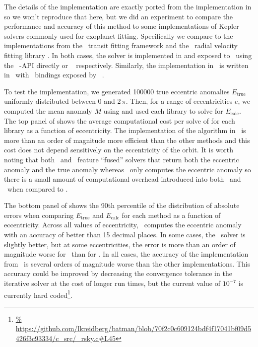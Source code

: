 \documentclass[modern]{aastex62}
\begin{document}
The details of the implementation are exactly ported from the implementation
in \citet{Nijenhuis:1991} so we won't reproduce that here, but we did an
experiment to compare the performance and accuracy of this method to some
implementations of Kepler solvers commonly used for exoplanet fitting.
Specifically we compare to the implementations from the \batman\ transit
fitting framework \citep{Kreidberg:2015} and the \radvel\ radial velocity
fitting library \citep{Fulton:2017, Fulton:2018}.
In both cases, the solver is implemented in  and exposed to
\python\ using the \python\ -API directly or \cython\
\citep{Behnel:2011} respectively.
Similarly, the implementation in \exoplanet\ is written in \cpp\ with \python\
bindings exposed by \theano\ \citep{Theano-Development-Team:2016}.

To test the implementation, we generated 100000 true eccentric anomalies
$E_\mathrm{true}$ uniformly distributed between $0$ and $2\,\pi$.
Then, for a range of eccentricities $e$, we computed the mean anomaly $M$ using
 and used each library to solve \eq{kepler-equation} for
$E_\mathrm{calc}$.
The top panel of \Figure{kepler_solver} shows the average computational cost per
solve of  for each library as a function of eccentricity.
The implementation of the \citet{Nijenhuis:1991} algorithm in \exoplanet\ is
more than an order of magnitude more efficient than the other methods and this
cost does not depend sensitively on the eccentricity of the orbit.
It is worth noting that both \batman\ and \exoplanet\ feature ``fused''
solvers that return both the eccentric anomaly and the true anomaly whereas
\radvel\ only computes the eccentric anomaly so there is a small amount of
computational overhead introduced into both \exoplanet\ and \batman\ when
compared to \radvel.

The bottom panel of  shows the 90th percentile of the
distribution of absolute errors when comparing $E_\mathrm{true}$ and
$E_\mathrm{calc}$ for each method as a function of eccentricity.
Across all values of eccentricity, \exoplanet\ computes the eccentric anomaly
with an accuracy of better than 15 decimal places.
In some cases, the \radvel\ solver is slightly better, but at some
eccentricities, the error is more than an order of magnitude worse for
\radvel\ than for \exoplanet.
In all cases, the accuracy of the implementation from \batman\ is several
orders of magnitude worse than the other implementations.
This accuracy could be improved by decreasing the convergence tolerance in the
iterative solver at the cost of longer run times, but the current value of
$10^{-7}$ is currently hard coded\footnote{\url{%
https://github.com/lkreidberg/batman/blob/70f2c0c609124bdf4f17041bf09d5426f3c93334/c\_src/\_rsky.c\#L45}}.
\end{document}
